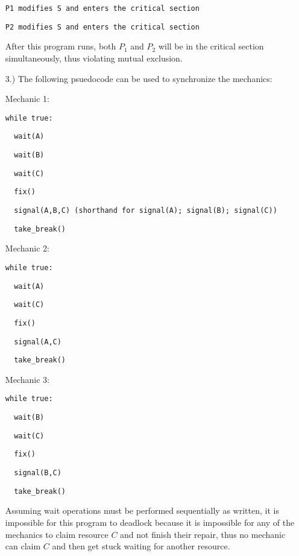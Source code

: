\documentclass[12pt]{article}
\begin{document}
\begin{itemize}
            \verb|P1 modifies S and enters the critical section|

            \verb|P2 modifies S and enters the critical section|

            After this program runs, both \( P_1 \) and \( P_2 \) will be in
            the critical section simultaneously, thus violating mutual
            exclusion.

        \pagebreak
        \item [3.)] The following psuedocode can be used to synchronize the mechanics:

            Mechanic 1:

            \verb|while true:|

            \verb|  wait(A)|

            \verb|  wait(B)|

            \verb|  wait(C)|

            \verb|  fix()|

            \verb|  signal(A,B,C) (shorthand for signal(A); signal(B); signal(C))|

            \verb|  take_break()|
            
            Mechanic 2:

            \verb|while true:|

            \verb|  wait(A)|

            \verb|  wait(C)|

            \verb|  fix()|

            \verb|  signal(A,C)|

            \verb|  take_break()|

            Mechanic 3:

            \verb|while true:|

            \verb|  wait(B)|

            \verb|  wait(C)|

            \verb|  fix()|

            \verb|  signal(B,C)|

            \verb|  take_break()|

            Assuming wait operations must be performed sequentially as written,
            it is impossible for this program to deadlock because it is 
            impossible for any of the mechanics to claim resource \( C \) and
            not finish their repair, thus no mechanic can claim \( C \)
            and then get stuck waiting for another resource.


\end{itemize}
\end{document}

